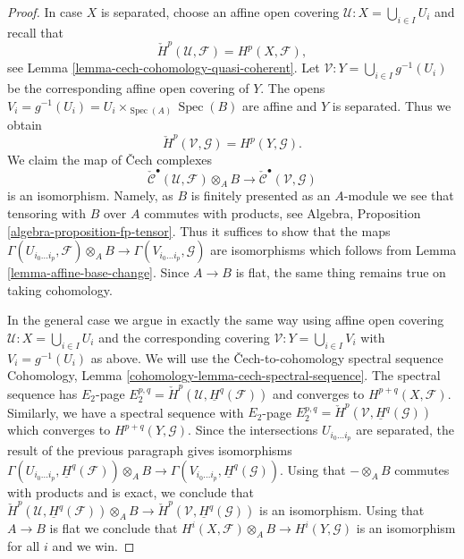 \documentclass{stacks-project}
\theoremstyle{plain}
\theoremstyle{definition}
\theoremstyle{remark}
\numberwithin{equation}{subsection}
\def\Spec{\mathop{\mathrm{Spec}}}
\begin{document}
\begin{proof}
In case $X$ is separated, choose an affine open covering
$\mathcal{U} : X = \bigcup_{i \in I} U_i$ and recall that
$$
\check{H}^p(\mathcal{U}, \mathcal{F}) = H^p(X, \mathcal{F}),
$$
see
Lemma \ref{lemma-cech-cohomology-quasi-coherent}.
Let $\mathcal{V} : Y = \bigcup_{i \in I} g^{-1}(U_i)$
be the corresponding affine open covering of $Y$.
The opens $V_i = g^{-1}(U_i) = U_i \times_{\Spec(A)} \Spec(B)$
are affine and $Y$ is separated. Thus we obtain
$$
\check{H}^p(\mathcal{V}, \mathcal{G}) = H^p(Y, \mathcal{G}).
$$
We claim the map of {\v C}ech complexes
$$
\check{\mathcal{C}}^\bullet(\mathcal{U}, \mathcal{F}) \otimes_A B
\longrightarrow
\check{\mathcal{C}}^\bullet(\mathcal{V}, \mathcal{G})
$$
is an isomorphism. Namely, as $B$ is finitely presented as an $A$-module
we see that tensoring with $B$ over $A$ commutes with products, see
Algebra, Proposition \ref{algebra-proposition-fp-tensor}.
Thus it suffices to show that the maps
$\Gamma(U_{i_0 \ldots i_p}, \mathcal{F}) \otimes_A B \to
\Gamma(V_{i_0 \ldots i_p}, \mathcal{G})$ 
are isomorphisms which follows from
Lemma \ref{lemma-affine-base-change}.
Since $A \to B$ is flat, the same thing remains true on taking cohomology.

\medskip\noindent
In the general case we argue in exactly the same way using affine
open covering $\mathcal{U} : X = \bigcup_{i \in I} U_i$ and the
corresponding covering $\mathcal{V} : Y = \bigcup_{i \in I} V_i$
with $V_i = g^{-1}(U_i)$ as above. We will use the
{\v C}ech-to-cohomology spectral sequence
Cohomology, Lemma \ref{cohomology-lemma-cech-spectral-sequence}.
The spectral sequence has $E_2$-page
$E_2^{p, q} = \check{H}^p(\mathcal{U}, \underline{H}^q(\mathcal{F}))$
and converges to $H^{p + q}(X, \mathcal{F})$.
Similarly, we have a spectral sequence with $E_2$-page
$E_2^{p, q} = \check{H}^p(\mathcal{V}, \underline{H}^q(\mathcal{G}))$
which converges to $H^{p + q}(Y, \mathcal{G})$.
Since the intersections $U_{i_0 \ldots i_p}$ are separated, the result
of the previous paragraph gives isomorphisms
$\Gamma(U_{i_0 \ldots i_p}, \underline{H}^q(\mathcal{F})) \otimes_A B
\to \Gamma(V_{i_0 \ldots i_p}, \underline{H}^q(\mathcal{G}))$.
Using that $- \otimes_A B$ commutes with products and is exact, we conclude
that
$\check{H}^p(\mathcal{U}, \underline{H}^q(\mathcal{F})) \otimes_A B
\to \check{H}^p(\mathcal{V}, \underline{H}^q(\mathcal{G}))$
is an isomorphism. Using that $A \to B$ is flat we conclude that
$H^i(X, \mathcal{F}) \otimes_A B \to H^i(Y, \mathcal{G})$
is an isomorphism for all $i$ and we win.
\end{proof}
\end{document}
